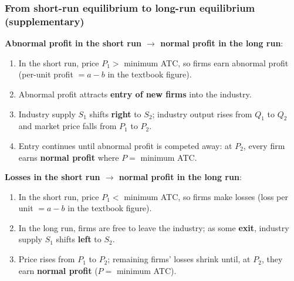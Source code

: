 \documentclass[a4paper,12pt]{article}
\begin{document}
\subsubsection*{From short-run equilibrium to long-run equilibrium (supplementary)}
\textbf{Abnormal profit in the short run $\to$ normal profit in the long run}:
\begin{enumerate}
  \item In the short run, price $P_1 >$ minimum ATC, so firms earn abnormal profit (per-unit profit $= a - b$ in the textbook figure).
  \item Abnormal profit attracts \textbf{entry of new firms} into the industry.
  \item Industry supply $S_1$ shifts \textbf{right} to $S_2$; industry output rises from $Q_1$ to $Q_2$ and market price falls from $P_1$ to $P_2$.
  \item Entry continues until abnormal profit is competed away: at $P_2$, every firm earns \textbf{normal profit} where $P = $ minimum ATC.
\end{enumerate}
\textbf{Losses in the short run $\to$ normal profit in the long run}:
\begin{enumerate}
  \item In the short run, price $P_1 <$ minimum ATC, so firms make losses (loss per unit $= a - b$ in the textbook figure).
  \item In the long run, firms are free to leave the industry; as some \textbf{exit}, industry supply $S_1$ shifts \textbf{left} to $S_2$.
  \item Price rises from $P_1$ to $P_2$; remaining firms' losses shrink until, at $P_2$, they earn \textbf{normal profit} ($P = $ minimum ATC).
\end{enumerate}
\end{document}
